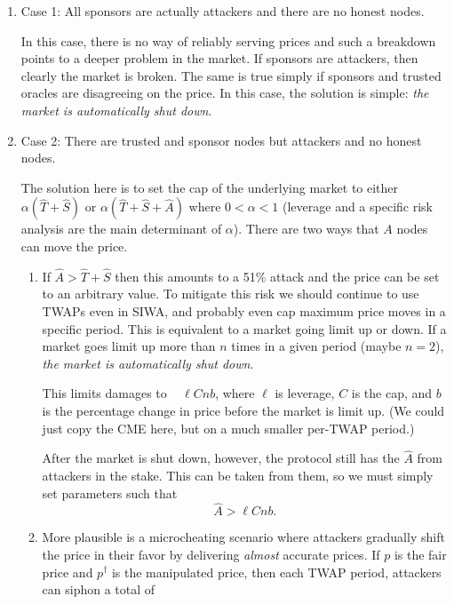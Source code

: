 \documentclass[11pt]{article}
\begin{document}
 \begin{enumerate}
	 \item Case 1: All sponsors are actually attackers and there are no honest nodes.  

		 In this case, there is no way of reliably serving prices and such a breakdown points to a deeper problem in the market. If sponsors are attackers, then clearly the market is broken. The same is true simply if sponsors and trusted oracles are disagreeing on the price. In this case, the solution is simple: {\it the market is automatically shut down}.

	 \item Case 2: There are trusted and sponsor nodes but attackers and no honest nodes. 

		 The solution here is to set the cap of the underlying market to either  $\alpha(\hat{T} + \hat{S})$ or $\alpha(\hat{T} + \hat{S} + \hat{A})$ where $0 < \alpha < 1$ (leverage and a specific risk analysis are the main determinant of $\alpha$).  There are two ways that $A$ nodes can move the price. 

		 \begin{enumerate} \item If $\hat{A} > \hat{T} + \hat{S}$ then this amounts to a 51\% attack and the price can be set to an arbitrary value. To mitigate this risk we should continue to use TWAPs even in SIWA, and probably even cap maximum price moves in a specific period. This is equivalent to a market going limit up or down. If a market goes limit up more than $n$ times in a given period (maybe $n=2$), {\it the market is automatically shut down}.

			 This limits damages to ~ $\ell C nb$, where $\ell$ is leverage, $C$ is the cap, and $b$ is the percentage change  in price before the market is limit up. (We could just copy the CME here, but on a much smaller per-TWAP period.)  

			 After the market is shut down, however, the protocol still has the $\hat{A}$ from attackers in the stake. This can be taken from them, so we must simply set parameters such that 
			 \begin{equation}
				 \hat{A} > \ell C nb.
			 \end{equation}
		 \item More plausible is a microcheating scenario where attackers gradually shift the price in their favor by delivering {\it almost} accurate prices. If $p$ is the fair price and $p^{\dagger}$ is the manipulated price, then each TWAP period, attackers can siphon a total of  


\end{enumerate}
\end{enumerate}
\end{document}
